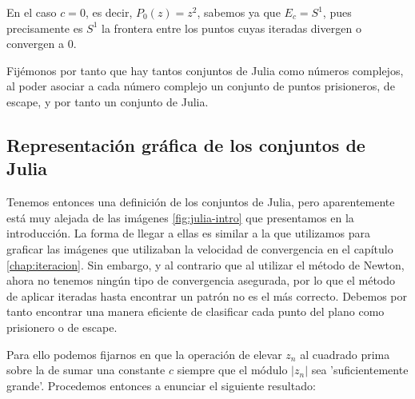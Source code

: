 \begin{ejemplo}
  En el caso $c=0$, es decir, $P_0(z)=z^2$, sabemos ya que $E_c=S^1$, pues precisamente es $S^1$ la frontera entre los puntos cuyas iteradas divergen o convergen a $0$.
\end{ejemplo}

\begin{observacion}
  Fijémonos por tanto que hay tantos conjuntos de Julia como números complejos, al poder asociar a cada número complejo un conjunto de puntos prisioneros, de escape, y por tanto un conjunto de Julia.
\end{observacion}

\subsection{Representación gráfica de los conjuntos de Julia}
\label{subsection:representacion-julia}

Tenemos entonces una definición de los conjuntos de Julia, pero aparentemente está muy alejada de las imágenes \ref{fig:julia-intro} que presentamos en la introducción. La forma de llegar a ellas es similar a la que utilizamos para graficar las imágenes que utilizaban la velocidad de convergencia en el capítulo \ref{chap:iteracion}. Sin embargo, y al contrario que al utilizar el método de Newton, ahora no tenemos ningún tipo de convergencia asegurada, por lo que el método de aplicar iteradas hasta encontrar un patrón no es el más correcto. Debemos por tanto encontrar una manera eficiente de clasificar cada punto del plano como prisionero o de escape. 

Para ello podemos fijarnos en que la operación de elevar $z_n$ al cuadrado prima sobre la de sumar una constante $c$ siempre que el módulo $|z_n|$ sea 'suficientemente grande'. Procedemos entonces a enunciar el siguiente resultado:

